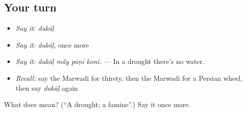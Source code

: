 \subsection*{Your turn}
\begin{itemize}
\raggedright
  \item \emph{Say it:} \emph{dukāḷ}
  \item \emph{Say it:} \emph{dukāḷ}, once more
  \item \emph{Say it:} \emph{dukāḷ mā̃y pāṇī konī.} — In a drought there's no water.
  \item \emph{Recall:} say the Marwadi for thirsty, then the Marwadi for a Persian wheel, then say \emph{dukāḷ} again
\end{itemize}

\begin{tcolorbox}[breakable,colback=teal!4,colframe=teal!35!black,title={Before you move on}]
What does  mean? (\textquotedblleft{}A drought; a famine\textquotedblright{}.) Say it once more.
\end{tcolorbox}
